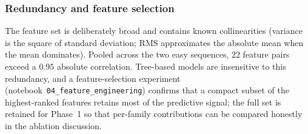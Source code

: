 \subsubsection{Redundancy and feature selection}
The feature set is deliberately broad and contains known collinearities
(variance is the square of standard deviation; RMS approximates the absolute
mean when the mean dominates). Pooled across the two easy sequences, $22$ feature
pairs exceed a $0.95$ absolute correlation. Tree-based models are insensitive
to this redundancy, and a feature-selection experiment
(notebook~\texttt{04\_feature\_engineering}) confirms that a compact subset of
the highest-ranked features retains most of the predictive signal; the full
set is retained for Phase~1 so that per-family contributions can be compared
honestly in the ablation discussion.
